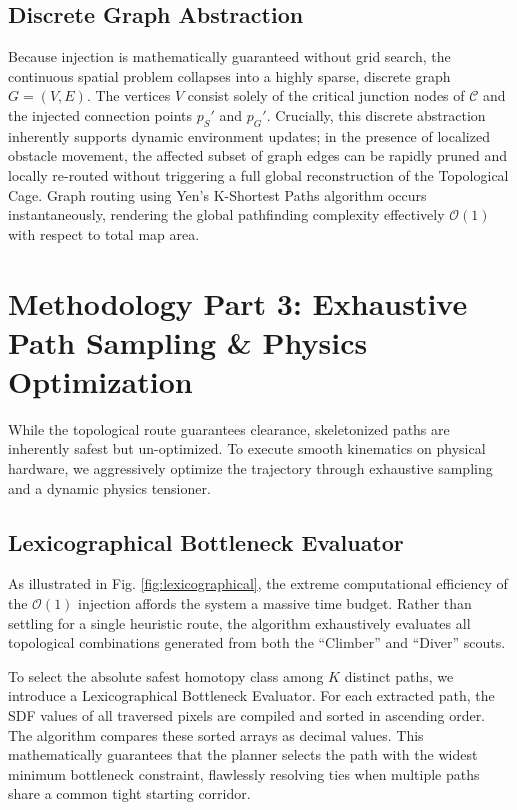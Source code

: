 \documentclass[letterpaper, 10 pt, conference]{IEEEtran}
\begin{document}
\subsection{Discrete Graph Abstraction}
Because injection is mathematically guaranteed without grid search, the continuous spatial problem collapses into a highly sparse, discrete graph $G = (V, E)$. The vertices $V$ consist solely of the critical junction nodes of $\mathcal{C}$ and the injected connection points $p_S'$ and $p_G'$. Crucially, this discrete abstraction inherently supports dynamic environment updates; in the presence of localized obstacle movement, the affected subset of graph edges can be rapidly pruned and locally re-routed without triggering a full global reconstruction of the Topological Cage. Graph routing using Yen's K-Shortest Paths algorithm occurs instantaneously, rendering the global pathfinding complexity effectively $\mathcal{O}(1)$ with respect to total map area.

\section{Methodology Part 3: Exhaustive Path Sampling \& Physics Optimization}
While the topological route guarantees clearance, skeletonized paths are inherently safest but un-optimized. To execute smooth kinematics on physical hardware, we aggressively optimize the trajectory through exhaustive sampling and a dynamic physics tensioner.

\subsection{Lexicographical Bottleneck Evaluator}
As illustrated in Fig. \ref{fig:lexicographical}, the extreme computational efficiency of the $\mathcal{O}(1)$ injection affords the system a massive time budget. Rather than settling for a single heuristic route, the algorithm exhaustively evaluates all topological combinations generated from both the ``Climber'' and ``Diver'' scouts. 

To select the absolute safest homotopy class among $K$ distinct paths, we introduce a Lexicographical Bottleneck Evaluator. For each extracted path, the SDF values of all traversed pixels are compiled and sorted in ascending order. The algorithm compares these sorted arrays as decimal values. This mathematically guarantees that the planner selects the path with the widest minimum bottleneck constraint, flawlessly resolving ties when multiple paths share a common tight starting corridor.
\end{document}
